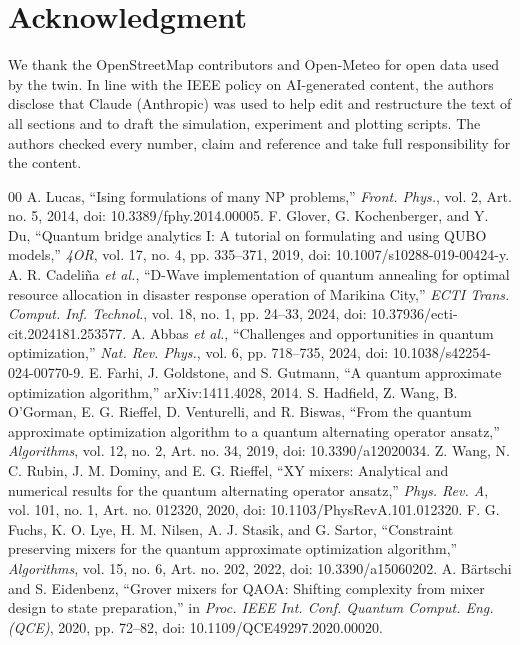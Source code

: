 \documentclass[conference]{IEEEtran}
\begin{document}
\section*{Acknowledgment}
We thank the OpenStreetMap contributors and Open-Meteo for open data used by the twin.
In line with the IEEE policy on AI-generated content, the authors disclose that Claude (Anthropic) was used to help edit and restructure the text of all sections and to draft the simulation, experiment and plotting scripts. The authors checked every number, claim and reference and take full responsibility for the content.

\balance
\begin{thebibliography}{00}
 A. Lucas, ``Ising formulations of many NP problems,'' \textit{Front. Phys.}, vol. 2, Art. no. 5, 2014, doi: 10.3389/fphy.2014.00005.
 F. Glover, G. Kochenberger, and Y. Du, ``Quantum bridge analytics I: A tutorial on formulating and using QUBO models,'' \textit{4OR}, vol. 17, no. 4, pp. 335--371, 2019, doi: 10.1007/s10288-019-00424-y.
 A. R. Cadeli\~{n}a \textit{et al.}, ``D-Wave implementation of quantum annealing for optimal resource allocation in disaster response operation of Marikina City,'' \textit{ECTI Trans. Comput. Inf. Technol.}, vol. 18, no. 1, pp. 24--33, 2024, doi: 10.37936/ecti-cit.2024181.253577.
 A. Abbas \textit{et al.}, ``Challenges and opportunities in quantum optimization,'' \textit{Nat. Rev. Phys.}, vol. 6, pp. 718--735, 2024, doi: 10.1038/s42254-024-00770-9.
 E. Farhi, J. Goldstone, and S. Gutmann, ``A quantum approximate optimization algorithm,'' arXiv:1411.4028, 2014.
 S. Hadfield, Z. Wang, B. O'Gorman, E. G. Rieffel, D. Venturelli, and R. Biswas, ``From the quantum approximate optimization algorithm to a quantum alternating operator ansatz,'' \textit{Algorithms}, vol. 12, no. 2, Art. no. 34, 2019, doi: 10.3390/a12020034.
 Z. Wang, N. C. Rubin, J. M. Dominy, and E. G. Rieffel, ``XY mixers: Analytical and numerical results for the quantum alternating operator ansatz,'' \textit{Phys. Rev. A}, vol. 101, no. 1, Art. no. 012320, 2020, doi: 10.1103/PhysRevA.101.012320.
 F. G. Fuchs, K. O. Lye, H. M. Nilsen, A. J. Stasik, and G. Sartor, ``Constraint preserving mixers for the quantum approximate optimization algorithm,'' \textit{Algorithms}, vol. 15, no. 6, Art. no. 202, 2022, doi: 10.3390/a15060202.
 A. B\"{a}rtschi and S. Eidenbenz, ``Grover mixers for QAOA: Shifting complexity from mixer design to state preparation,'' in \textit{Proc. IEEE Int. Conf. Quantum Comput. Eng. (QCE)}, 2020, pp. 72--82, doi: 10.1109/QCE49297.2020.00020.

\end{thebibliography}
\end{document}
